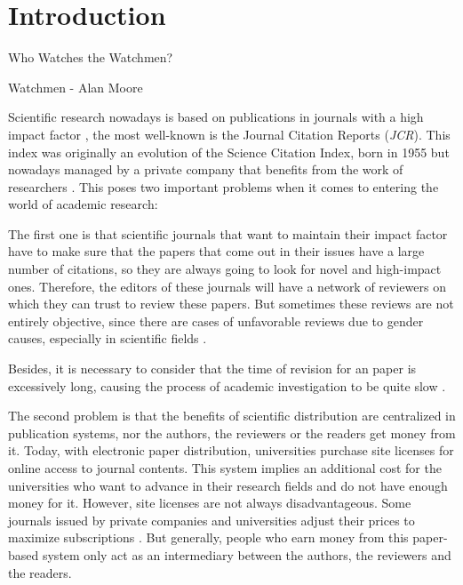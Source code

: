 \chapter{Introduction}
\label{intro}
\begin{FraseCelebre}
  \begin{Frase}
    Who Watches the Watchmen?
  \end{Frase}
  \begin{Fuente}
    Watchmen - Alan Moore
  \end{Fuente}
\end{FraseCelebre}

Scientific research nowadays is based on publications in journals with a high
impact factor \cite{doi:10.1001/jama.295.1.90}, the most well-known is the
Journal Citation Reports (\emph{JCR}). This index was originally an evolution of
the Science Citation Index, born in 1955 \cite{garfield2007evolution} but
nowadays managed by a private company that benefits from the work of researchers
\cite{toledo2011book}. This poses two important problems when it comes to
entering the world of academic research:

The first one is that scientific journals that want to maintain their impact
factor have to make sure that the papers that come out in their issues have a
large number of citations, so they are always going to look for novel and
high-impact ones. Therefore, the editors of these journals will have a network
of reviewers on which they can trust to review these papers. But sometimes these
reviews are not entirely objective, since there are cases of unfavorable reviews
due to gender causes, especially in scientific fields
\cite{wenneras2001nepotism}.

Besides, it is necessary to consider that the time of revision for an paper is
excessively long, causing the process of academic investigation to be quite slow
\cite{huisman2017duration}.

The second problem is that the benefits of scientific distribution are
centralized in publication systems, nor the authors, the reviewers or the
readers get money from it. Today, with electronic paper distribution,
universities purchase site licenses for online access to journal contents. This
system implies an additional cost for the universities who want to advance in
their research fields and do not have enough money for it. However, site
licenses are not always disadvantageous. Some journals issued by private
companies and universities adjust their prices to maximize subscriptions
\cite{bergstrom2004costs}. But generally, people who earn money from this
paper-based system only act as an intermediary between the authors, the
reviewers and the readers.

